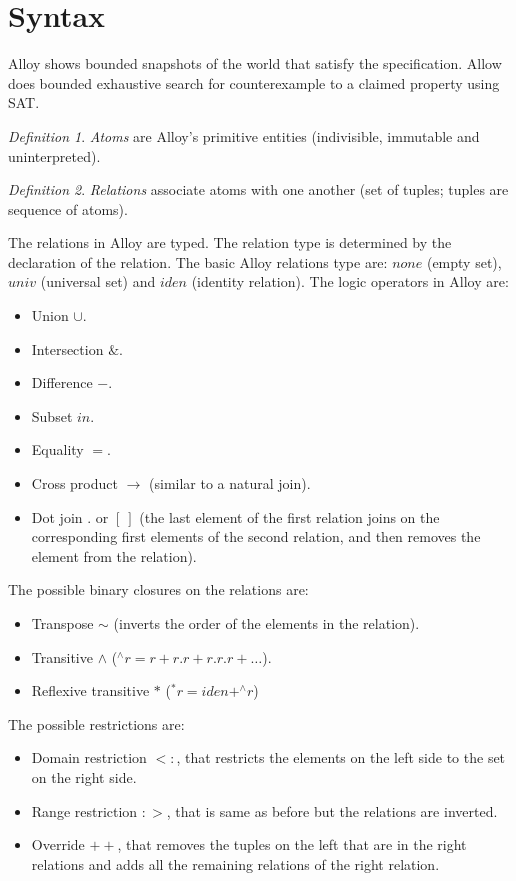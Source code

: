\documentclass[12pt, a4paper]{report}
\theoremstyle{remark}
\newtheorem*{remark}{Definition}
\begin{document}
\section{Syntax}
    Alloy shows bounded snapshots of the world that satisfy the specification. Allow does bounded exhaustive search for counterexample to a claimed property using SAT.
    \begin{remark}
        \emph{Atoms} are Alloy's primitive entities (indivisible, immutable and uninterpreted). 
    \end{remark}
    \begin{remark}
        \emph{Relations} associate atoms with one another (set of tuples; tuples are sequence of atoms).
    \end{remark}
    The relations in Alloy are typed. The relation type is determined by the declaration of the relation. The basic Alloy relations type are: $none$ (empty set), $univ$ (universal set) and $iden$ (identity relation). The logic operators in Alloy are: 
    \begin{itemize}
        \item Union $\cup$.
        \item Intersection $\&$.
        \item Difference $-$.
        \item Subset $in$.
        \item Equality $=$.
        \item Cross product $\rightarrow$ (similar to a natural join). 
        \item Dot join $.$ or $[\:]$ (the last element of the first relation joins on the corresponding first elements of the second relation, and then removes the element from the relation).
    \end{itemize}
    The possible binary closures on the relations are: 
    \begin{itemize}
        \item Transpose $\sim$ (inverts the order of the elements in the relation).
        \item Transitive $\land$ ($^{\land}r=r+r.r+r.r.r+\dots$). 
        \item Reflexive transitive $*$ ($^{*}r=iden+^{\land}r$)
    \end{itemize}
    The possible restrictions are: 
    \begin{itemize}
        \item Domain restriction $<:$, that restricts the elements on the left side to the set on the right side.
        \item Range restriction $:>$, that is same as before but the relations are inverted. 
        \item Override $++$, that removes the tuples on the left that are in the right relations and adds all the remaining relations of the right relation. 
    \end{itemize}
\end{document}
